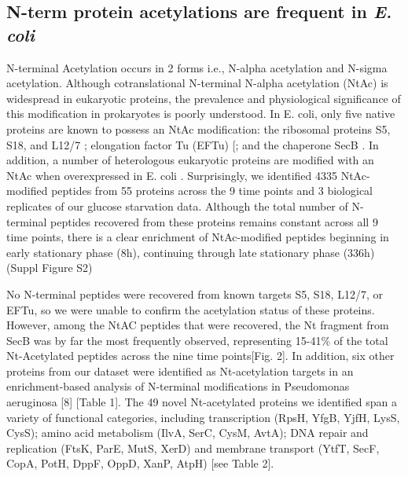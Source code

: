 \documentclass[12pt]{article}
\begin{document}
\subsection{N-term protein acetylations are frequent in \emph{E. coli}}

N-terminal Acetylation occurs in 2 forms i.e., N-{alpha} acetylation and N-{sigma} acetylation. Although cotranslational N-terminal N-{alpha} acetylation (NtAc) is widespread in eukaryotic proteins, the prevalence and physiological significance of this modification in prokaryotes is poorly understood. In E. coli, only five native proteins are known to possess an NtAc modification: the ribosomal proteins S5, S18, and L12/7 \cite{Nesterchuketal2011}; elongation factor Tu (EFTu) [\cite{Araietal1980}; and the chaperone SecB  \cite{Smithetal1996}. In addition, a number of heterologous eukaryotic proteins are modified with an NtAc when overexpressed in E. coli  \cite{Bernal-Perezetal2012}\cite{Charbautetal2002}\cite{Wuetal2006}\cite{Miaoetal2007}. Surprisingly, we identified 4335 NtAc-modified peptides from 55 proteins across the 9 time points and 3 biological replicates of our glucose starvation data. Although the total number of N-terminal peptides recovered from these proteins remains constant across all 9 time points, there is a clear enrichment of NtAc-modified peptides beginning in early stationary phase (8h), continuing through late stationary phase (336h) (Suppl Figure S2)

No N-terminal peptides were recovered from known targets S5, S18, L12/7, or EFTu, so we were unable to confirm the acetylation status of these proteins.  However, among the NtAC peptides that were recovered, the Nt fragment from SecB was by far the most frequently observed, representing 15-41\% of the total Nt-Acetylated peptides across the nine time points[Fig. 2]. In addition, six other proteins from our dataset were identified as Nt-acetylation targets in an enrichment-based analysis of N-terminal modifications in Pseudomonas aeruginosa [8] [Table 1]. The 49 novel Nt-acetylated proteins we identified span a variety of functional categories, including transcription (RpsH, YfgB, YjfH, LysS, CysS); amino acid metabolism (IlvA, SerC, CysM, AvtA); DNA repair and replication (FtsK, ParE, MutS, XerD) and membrane transport (YtfT, SecF, CopA, PotH, DppF, OppD, XanP, AtpH) [see Table 2]. 
\end{document}

